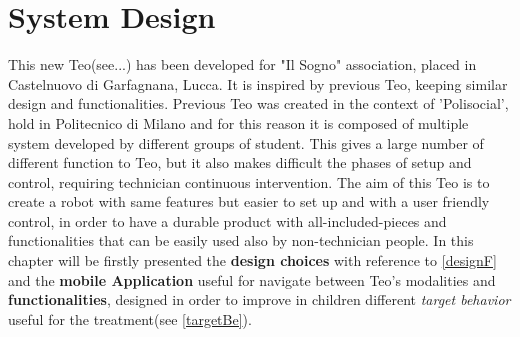 \chapter{System Design}
\label{chapter4}
\ifpdf
\graphicspath{{Chapter4/Figs/Raster/}{Chapter4/Figs/PDF/}{Chapter4/Figs/}}
\else
\graphicspath{{Chapter4/Figs/Vector/}{Chapter4/Figs/}}
\fi

This new Teo(see...) has been developed for "Il Sogno" association, placed in Castelnuovo di Garfagnana, Lucca. It is inspired by previous Teo, keeping similar design and functionalities. Previous Teo was created in the context of 'Polisocial', hold in Politecnico di Milano and for this reason it is composed of multiple system developed by different groups of student. This gives a large number of different function to Teo, but it also makes difficult the phases of setup and control, requiring technician continuous intervention. The aim of this Teo is to create a robot with same features but easier to set up and with a user friendly control, in order to have a durable product with all-included-pieces and functionalities that can be easily used also by non-technician people. In this chapter will be firstly presented the \textbf{design choices} with reference to \ref{designF} and the \textbf{mobile Application} useful for navigate between Teo's modalities and \textbf{functionalities}, designed in order to improve in children different \textit{target behavior} useful for the treatment(see \ref{targetBe}).
